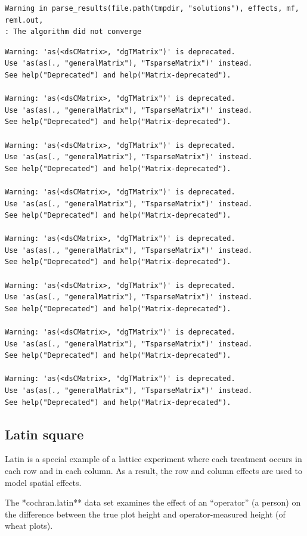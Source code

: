 \documentclass[
]{book}
\begin{document}
\begin{verbatim}
Warning in parse_results(file.path(tmpdir, "solutions"), effects, mf, reml.out,
: The algorithm did not converge
\end{verbatim}

\begin{verbatim}
Warning: 'as(<dsCMatrix>, "dgTMatrix")' is deprecated.
Use 'as(as(., "generalMatrix"), "TsparseMatrix")' instead.
See help("Deprecated") and help("Matrix-deprecated").

Warning: 'as(<dsCMatrix>, "dgTMatrix")' is deprecated.
Use 'as(as(., "generalMatrix"), "TsparseMatrix")' instead.
See help("Deprecated") and help("Matrix-deprecated").

Warning: 'as(<dsCMatrix>, "dgTMatrix")' is deprecated.
Use 'as(as(., "generalMatrix"), "TsparseMatrix")' instead.
See help("Deprecated") and help("Matrix-deprecated").

Warning: 'as(<dsCMatrix>, "dgTMatrix")' is deprecated.
Use 'as(as(., "generalMatrix"), "TsparseMatrix")' instead.
See help("Deprecated") and help("Matrix-deprecated").

Warning: 'as(<dsCMatrix>, "dgTMatrix")' is deprecated.
Use 'as(as(., "generalMatrix"), "TsparseMatrix")' instead.
See help("Deprecated") and help("Matrix-deprecated").

Warning: 'as(<dsCMatrix>, "dgTMatrix")' is deprecated.
Use 'as(as(., "generalMatrix"), "TsparseMatrix")' instead.
See help("Deprecated") and help("Matrix-deprecated").

Warning: 'as(<dsCMatrix>, "dgTMatrix")' is deprecated.
Use 'as(as(., "generalMatrix"), "TsparseMatrix")' instead.
See help("Deprecated") and help("Matrix-deprecated").

Warning: 'as(<dsCMatrix>, "dgTMatrix")' is deprecated.
Use 'as(as(., "generalMatrix"), "TsparseMatrix")' instead.
See help("Deprecated") and help("Matrix-deprecated").
\end{verbatim}

\hypertarget{latin-square}{%
\subsection{Latin square}\label{latin-square}}

Latin is a special example of a lattice experiment where each treatment occurs in each row and in each column. As a result, the row and column effects are used to model spatial effects.

The *cochran.latin** data set examines the effect of an ``operator'' (a person) on the difference between the true plot height and operator-measured height (of wheat plots).
\end{document}
